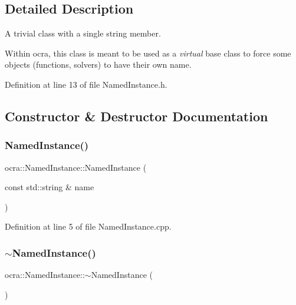 \subsection{Detailed Description}
A trivial class with a single string member.

Within ocra, this class is meant to be used as a {\itshape virtual} base class to force some objects (functions, solvers) to have their own name. 

Definition at line 13 of file Named\+Instance.\+h.



\subsection{Constructor \& Destructor Documentation}
\hypertarget{classocra_1_1NamedInstance_a561d3cf2c7b1120ff3160c55ec89afbb}{}\label{classocra_1_1NamedInstance_a561d3cf2c7b1120ff3160c55ec89afbb} 
\subsubsection{\texorpdfstring{Named\+Instance()}{NamedInstance()}}
{\footnotesize\ttfamily ocra\+::\+Named\+Instance\+::\+Named\+Instance (\begin{DoxyParamCaption}\item[{const std\+::string \&}]{name }\end{DoxyParamCaption})}



Definition at line 5 of file Named\+Instance.\+cpp.

\hypertarget{classocra_1_1NamedInstance_a0caaa1040def535f34f527b7f7f590cf}{}\label{classocra_1_1NamedInstance_a0caaa1040def535f34f527b7f7f590cf} 
\subsubsection{\texorpdfstring{$\sim$\+Named\+Instance()}{~NamedInstance()}}
{\footnotesize\ttfamily ocra\+::\+Named\+Instance\+::$\sim$\+Named\+Instance (\begin{DoxyParamCaption}{ }\end{DoxyParamCaption})\hspace{0.3cm}{\ttfamily [virtual]}}



